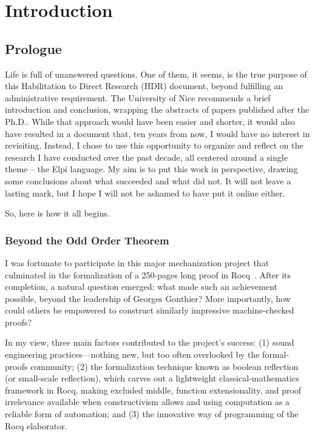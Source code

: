 \documentclass{these-ISSS}
\begin{document}

\setcounter{tocdepth}{5}
\tableofcontents
  \mainmatter

 \chapter{Introduction}


\section{Prologue}



Life is full of unanswered questions. One of them, it seems, is the true purpose
of this Habilitation to Direct Research (HDR) document, beyond fulfilling an administrative requirement. The
University of Nice recommends a brief introduction and conclusion, wrapping
the abstracts of papers published after the Ph.D.. While that approach would have
been easier and shorter, it would also have resulted in a document that, ten
years from now, I would have no interest in revisiting. Instead, I chose to use
this opportunity to organize and reflect on the research I have conducted over
the past decade, all centered around a single theme -- the Elpi language. My aim is
to put this work in perspective, drawing some conclusions about what succeeded
and what did not. It will not leave a lasting mark, but I hope I will not be
ashamed to have put it online either.

So, here is how it all begins.

\subsection{Beyond the Odd Order Theorem}



I was fortunate to participate in this major mechanization project that culminated
in the formalization of a 250-pages long proof in Rocq~\cite{DBLP:conf/itp/GonthierAABCGRMOBPRSTT13}.
After its completion, a natural question emerged: what made such an achievement
possible, beyond the leadership of Georges Gonthier? More importantly, how could
others be empowered to construct similarly impressive machine-checked proofs?

In my view, three main factors contributed to the project's success: (1) sound
engineering practices—nothing new, but too often overlooked by the formal-proofs
community; (2) the formalization technique known as boolean reflection (or
small-scale reflection), which carves out a lightweight classical-mathematics
framework in Rocq, making excluded middle, function extensionality, and proof
irrelevance available when constructivism allows and using
computation as a reliable form of automation; and (3) the innovative way of
programming of the Rocq elaborator.
\end{document}

